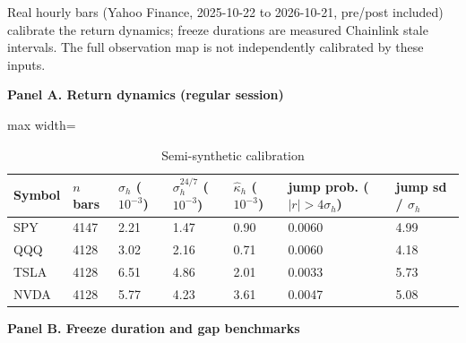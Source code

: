 \begin{table}[!htbp]
\centering
\scriptsize
\caption{Semi-synthetic calibration}
\label{tab:b3}
\par\noindent\begin{minipage}{\linewidth}\raggedright{\scriptsize Real hourly bars (Yahoo Finance, 2025-10-22 to 2026-10-21, pre/post included) calibrate the return dynamics; freeze durations are measured Chainlink stale intervals. The full observation map is not independently calibrated by these inputs.}\end{minipage}\par

\par\textbf{Panel A. Return dynamics (regular session)}

\begin{adjustbox}{max width=\linewidth}
\begin{tabular}{@{}lllllll@{}}
\toprule
Symbol & $n$ bars & $\sigma_h$ ($10^{-3}$) & $\sigma_h^{24/7}$ ($10^{-3}$) & $\hat\kappa_h$ ($10^{-3}$) & jump prob. ($\lvert r\rvert>4\sigma_h$) & jump sd / $\sigma_h$ \\
\midrule
SPY & 4147 & 2.21 & 1.47 & 0.90 & 0.0060 & 4.99 \\
QQQ & 4128 & 3.02 & 2.16 & 0.71 & 0.0060 & 4.18 \\
TSLA & 4128 & 6.51 & 4.86 & 2.01 & 0.0033 & 5.73 \\
NVDA & 4128 & 5.77 & 4.23 & 3.61 & 0.0047 & 5.08 \\
\bottomrule
\end{tabular}
\end{adjustbox}
\vspace{0.5em}
\par\textbf{Panel B. Freeze duration and gap benchmarks}


\end{table}
